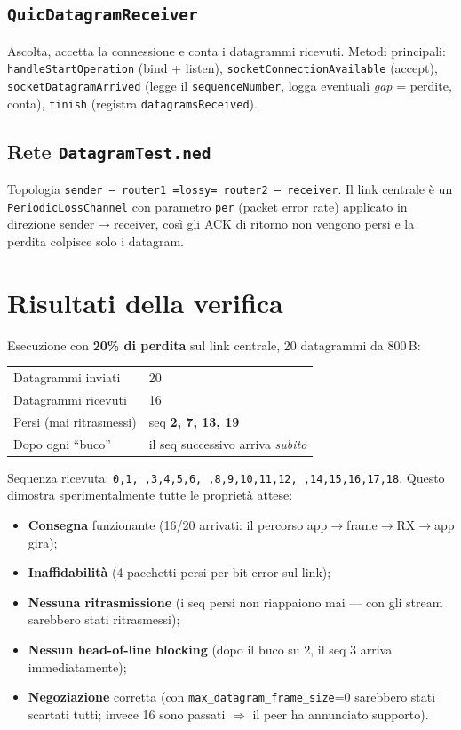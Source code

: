 \documentclass[11pt,a4paper]{article}
\newcommand{\code}[1]{\texttt{#1}}
\begin{document}
\subsection{\code{QuicDatagramReceiver}}
Ascolta, accetta la connessione e conta i datagrammi ricevuti. Metodi principali:
\code{handleStartOperation} (bind + listen), \code{socketConnectionAvailable} (accept),
\code{socketDatagramArrived} (legge il \code{sequenceNumber}, logga eventuali \emph{gap} = perdite, conta),
\code{finish} (registra \code{datagramsReceived}).

\subsection{Rete \code{DatagramTest.ned}}
Topologia \code{sender -- router1 =lossy= router2 -- receiver}. Il link centrale \`e un
\code{PeriodicLossChannel} con parametro \code{per} (packet error rate) applicato in direzione
sender$\to$receiver, cos\`i gli ACK di ritorno non vengono persi e la perdita colpisce solo i datagram.

\section{Risultati della verifica}
Esecuzione con \textbf{20\% di perdita} sul link centrale, 20 datagrammi da 800\,B:

\begin{table}[h]\centering\small
\begin{tabular}{@{}ll@{}}
\toprule
Datagrammi inviati & 20\\
Datagrammi ricevuti & 16\\
Persi (mai ritrasmessi) & seq \textbf{2, 7, 13, 19}\\
Dopo ogni ``buco'' & il seq successivo arriva \emph{subito}\\
\bottomrule
\end{tabular}
\end{table}

\noindent Sequenza ricevuta: \code{0,1,\_,3,4,5,6,\_,8,9,10,11,12,\_,14,15,16,17,18}. Questo dimostra
sperimentalmente tutte le propriet\`a attese:
\begin{itemize}[nosep,leftmargin=1.4em]
  \item \textbf{Consegna} funzionante (16/20 arrivati: il percorso app$\to$frame$\to$RX$\to$app gira);
  \item \textbf{Inaffidabilit\`a} (4 pacchetti persi per bit-error sul link);
  \item \textbf{Nessuna ritrasmissione} (i seq persi non riappaiono mai --- con gli stream sarebbero stati
    ritrasmessi);
  \item \textbf{Nessun head-of-line blocking} (dopo il buco su 2, il seq 3 arriva immediatamente);
  \item \textbf{Negoziazione} corretta (con \code{max\_datagram\_frame\_size}=0 sarebbero stati scartati tutti;
    invece 16 sono passati $\Rightarrow$ il peer ha annunciato supporto).
\end{itemize}
\end{document}
